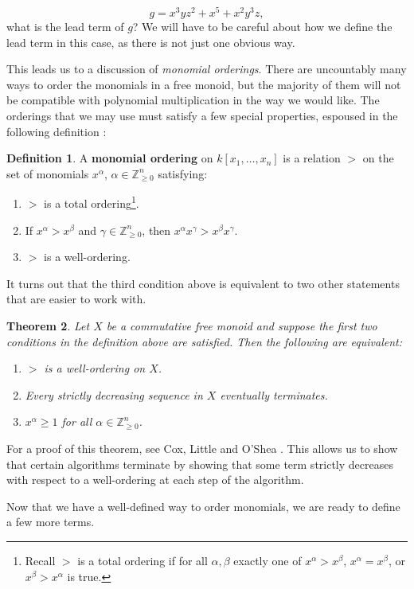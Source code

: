 \documentclass[MS, xcolor=dvipsnames]{wfuthesis}
\def\bZ{\mathbb{Z}}
\newtheorem{theorem}{Theorem}
\theoremstyle{definition}
\newtheorem{definition}[theorem]{Definition}
\begin{document}
\[ g = x^3yz^2 + x^5 + x^2y^3z, \]
what is the lead term of $g$? We will have to be careful about how we define the lead term in this case, as there is not just one obvious way. \par
This leads us to a discussion of \textit{monomial orderings}. There are uncountably many ways to order the monomials in a free monoid, but the majority of them will not be compatible with polynomial multiplication in the way we would like. The orderings that we may use must satisfy a few special properties, espoused in the following definition \cite{Cox2015}:
\begin{definition}
  A \textbf{monomial ordering} on $k[x_1,\dots,x_n]$ is a relation $>$ on the set of monomials $x^\alpha$, $\alpha \in \bZ_{\ge0}^n$ satisfying:
  \begin{enumerate}[label=(\roman*)]
    \item $>$ is a total ordering\footnote{Recall $>$ is a total ordering if for all $\alpha,\beta$ exactly one of $x^\alpha > x^\beta$, $x^\alpha = x^\beta$, or $x^\beta > x^\alpha$ is true.}.
    \item If $x^\alpha > x^\beta$ and $\gamma \in \bZ_{\ge0}^n$, then $x^\alpha x^\gamma > x^\beta x^\gamma$.
    \item $>$ is a well-ordering.
  \end{enumerate}
\end{definition}
It turns out that the third condition above is equivalent to two other statements that are easier to work with.
\begin{theorem}
  Let $X$ be a commutative free monoid and suppose the first two conditions in the definition above are satisfied. Then the following are equivalent:
  \begin{enumerate}
    \item $>$ is a well-ordering on $X$.
    \item Every strictly decreasing sequence in $X$ eventually terminates.
    \item $x^\alpha\ge1$ for all $\alpha \in \bZ_{\ge0}^n$.
  \end{enumerate}
\end{theorem}
For a proof of this theorem, see Cox, Little and O'Shea \cite{Cox2015}. This allows us to show that certain algorithms terminate by showing that some term strictly decreases with respect to a well-ordering at each step of the algorithm. \par
Now that we have a well-defined way to order monomials, we are ready to define a few more terms.
\end{document}
